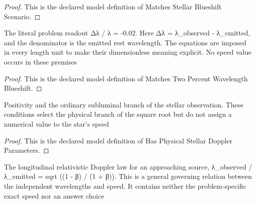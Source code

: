 \begin{proof}
  This is the declared model definition of Matches Stellar Blueshift Scenario.
\end{proof}
\begin{definition}
  \label{def:physics:phyx-mini-0567:phyxminiproblems-problemphyxmini0567-matchestwopercentwavelengthblueshift}
  The literal problem readout Δλ / λ = -0.02. Here Δλ = λ\_observed - λ\_emitted, and the denominator is the emitted rest wavelength. The equations are imposed in every length unit to make their dimensionless meaning explicit. No speed value occurs in these premises
\end{definition}
\begin{proof}
  This is the declared model definition of Matches Two Percent Wavelength Blueshift.
\end{proof}
\begin{definition}
  \label{def:physics:phyx-mini-0567:phyxminiproblems-problemphyxmini0567-hasphysicalstellardopplerparameters}
  Positivity and the ordinary subluminal branch of the stellar observation. These conditions select the physical branch of the square root but do not assign a numerical value to the star's speed
\end{definition}
\begin{proof}
  This is the declared model definition of Has Physical Stellar Doppler Parameters.
\end{proof}
\begin{definition}
  \label{def:physics:phyx-mini-0567:phyxminiproblems-problemphyxmini0567-satisfiesapproachingsourcerelativisticdopplerlaw}
  The longitudinal relativistic Doppler law for an approaching source, λ\_observed / λ\_emitted = sqrt ((1 - β) / (1 + β)). This is a general governing relation between the independent wavelengths and speed. It contains neither the problem-specific exact speed nor an answer choice
\end{definition}
